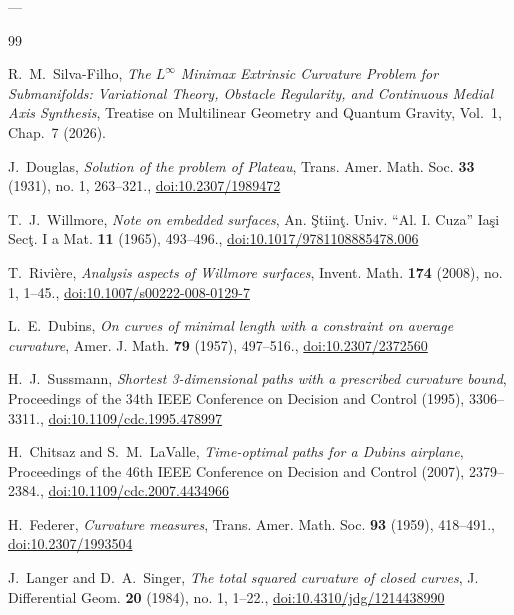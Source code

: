 \documentclass[11pt,reqno]{amsart}
\theoremstyle{definition}
\numberwithin{equation}{section}
\begin{document}
---

\begin{thebibliography}{99}

R.~M.~Silva-Filho,
\emph{The $L^\infty$ Minimax Extrinsic Curvature Problem for Submanifolds: Variational Theory, Obstacle Regularity, and Continuous Medial Axis Synthesis},
Treatise on Multilinear Geometry and Quantum Gravity, Vol.~1, Chap.~7 (2026).



J.~Douglas,
\emph{Solution of the problem of Plateau},
Trans. Amer. Math. Soc. \textbf{33} (1931), no. 1, 263--321., \href{https://doi.org/10.2307/1989472}{doi:10.2307/1989472}

T.~J.~Willmore,
\emph{Note on embedded surfaces},
An. \c{S}tiin\c{t}. Univ. ``Al. I. Cuza'' Ia\c{s}i Sec\c{t}. I a Mat. \textbf{11} (1965), 493--496., \href{https://doi.org/10.1017/9781108885478.006}{doi:10.1017/9781108885478.006}

T.~Rivi\`ere,
\emph{Analysis aspects of Willmore surfaces},
Invent. Math. \textbf{174} (2008), no. 1, 1--45., \href{https://doi.org/10.1007/s00222-008-0129-7}{doi:10.1007/s00222-008-0129-7}

L.~E.~Dubins,
\emph{On curves of minimal length with a constraint on average curvature},
Amer. J. Math. \textbf{79} (1957), 497--516., \href{https://doi.org/10.2307/2372560}{doi:10.2307/2372560}

H.~J.~Sussmann,
\emph{Shortest 3-dimensional paths with a prescribed curvature bound},
Proceedings of the 34th IEEE Conference on Decision and Control (1995), 3306--3311., \href{https://doi.org/10.1109/cdc.1995.478997}{doi:10.1109/cdc.1995.478997}

H.~Chitsaz and S.~M.~LaValle,
\emph{Time-optimal paths for a Dubins airplane},
Proceedings of the 46th IEEE Conference on Decision and Control (2007), 2379--2384., \href{https://doi.org/10.1109/cdc.2007.4434966}{doi:10.1109/cdc.2007.4434966}

H.~Federer,
\emph{Curvature measures},
Trans. Amer. Math. Soc. \textbf{93} (1959), 418--491., \href{https://doi.org/10.2307/1993504}{doi:10.2307/1993504}

J.~Langer and D.~A.~Singer,
\emph{The total squared curvature of closed curves},
J. Differential Geom. \textbf{20} (1984), no. 1, 1--22., \href{https://doi.org/10.4310/jdg/1214438990}{doi:10.4310/jdg/1214438990}


\end{thebibliography}
\end{document}
